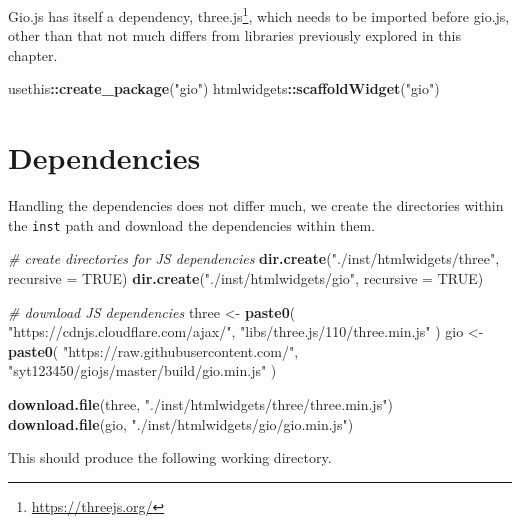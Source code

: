 \documentclass[
]{krantz}
\makeatletter
\newenvironment{Shaded}{\begin{snugshade}}{\end{snugshade}}
\newcommand{\CommentTok}[1]{\textcolor[rgb]{0.37,0.37,0.37}{\textit{#1}}}
\newcommand{\DataTypeTok}[1]{\textcolor[rgb]{0.27,0.27,0.27}{#1}}
\newcommand{\KeywordTok}[1]{\textcolor[rgb]{0.27,0.27,0.27}{\textbf{#1}}}
\newcommand{\NormalTok}[1]{#1}
\newcommand{\OperatorTok}[1]{\textcolor[rgb]{0.43,0.43,0.43}{\textbf{#1}}}
\newcommand{\OtherTok}[1]{\textcolor[rgb]{0.37,0.37,0.37}{#1}}
\newcommand{\StringTok}[1]{\textcolor[rgb]{0.5,0.5,0.5}{#1}}
\renewcommand{\href}[2]{#2\footnote{\url{#1}}}
\newenvironment{kframe}{%
\medskip{}
\setlength{\fboxsep}{.8em}
 \def\at@end@of@kframe{}%
 \ifinner\ifhmode%
  \def\at@end@of@kframe{\end{minipage}}%
  \begin{minipage}{\columnwidth}%
 \fi\fi%
 \def\FrameCommand##1{\hskip\@totalleftmargin \hskip-\fboxsep
 \colorbox{shadecolor}{##1}\hskip-\fboxsep
     \hskip-\linewidth \hskip-\@totalleftmargin \hskip\columnwidth}%
 \MakeFramed {\advance\hsize-\width
   \@totalleftmargin\z@ \linewidth\hsize
   \@setminipage}}%
 {\par\unskip\endMakeFramed%
 \at@end@of@kframe}
\renewenvironment{Shaded}{\begin{kframe}}{\end{kframe}}
\makeatother
\begin{document}
Gio.js has itself a dependency, \href{https://threejs.org/}{three.js}, which needs to be imported before gio.js, other than that not much differs from libraries previously explored in this chapter.

\begin{Shaded}
\begin{Highlighting}[]
\NormalTok{usethis}\OperatorTok{::}\KeywordTok{create\_package}\NormalTok{(}\StringTok{"gio"}\NormalTok{)}
\NormalTok{htmlwidgets}\OperatorTok{::}\KeywordTok{scaffoldWidget}\NormalTok{(}\StringTok{"gio"}\NormalTok{)}
\end{Highlighting}
\end{Shaded}

\hypertarget{widgets-full-deps}{%
\section{Dependencies}\label{widgets-full-deps}}

Handling the dependencies does not differ much, we create the directories within the \texttt{inst} path and download the dependencies within them.

\begin{Shaded}
\begin{Highlighting}[]
\CommentTok{\# create directories for JS dependencies}
\KeywordTok{dir.create}\NormalTok{(}\StringTok{"./inst/htmlwidgets/three"}\NormalTok{, }\DataTypeTok{recursive =} \OtherTok{TRUE}\NormalTok{)}
\KeywordTok{dir.create}\NormalTok{(}\StringTok{"./inst/htmlwidgets/gio"}\NormalTok{, }\DataTypeTok{recursive =} \OtherTok{TRUE}\NormalTok{)}

\CommentTok{\# download JS dependencies}
\NormalTok{three <{-}}\StringTok{ }\KeywordTok{paste0}\NormalTok{(}
  \StringTok{"https://cdnjs.cloudflare.com/ajax/"}\NormalTok{,}
  \StringTok{"libs/three.js/110/three.min.js"}
\NormalTok{)}
\NormalTok{gio <{-}}\StringTok{ }\KeywordTok{paste0}\NormalTok{(}
  \StringTok{"https://raw.githubusercontent.com/"}\NormalTok{,}
  \StringTok{"syt123450/giojs/master/build/gio.min.js"}
\NormalTok{)}

\KeywordTok{download.file}\NormalTok{(three, }\StringTok{"./inst/htmlwidgets/three/three.min.js"}\NormalTok{)}
\KeywordTok{download.file}\NormalTok{(gio, }\StringTok{"./inst/htmlwidgets/gio/gio.min.js"}\NormalTok{)}
\end{Highlighting}
\end{Shaded}

This should produce the following working directory.
\end{document}
